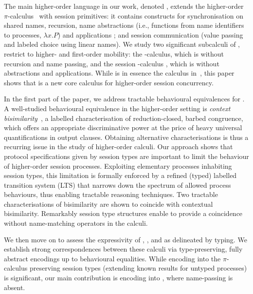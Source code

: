 The main higher-order language in our work, denoted \HOp,
extends the higher-order $\pi$-calculus~\cite{SangiorgiD:expmpa} with session primitives:
it contains constructs for 
synchronisation on shared names, 
recursion, 
name abstractions (i.e., functions from name identifiers  to processes, 
$\lambda x.P$) and applications 
;
and session communication (value passing and
labeled choice using linear names). 
We study two significant subcalculi of \HOp, 
restrict to higher- and first-order mobility:
the \HO-calculus, which is \HOp without recursion and name passing, and 
the session \sessp-calculus , which is \HOp without abstractions and applications.  
While \sessp is 
in essence the calculus in~\cite{honda.vasconcelos.kubo:language-primitives}, 
this paper shows that \HO  is a new core calculus 
for higher-order session concurrency.

In the first part of the paper, we address tractable behavioural equivalences
for \HOp.
A well-studied behavioural equivalence in the higher-order setting 
is \emph{context bisimilarity}~\cite{San96H},
a labelled characterisation of reduction-closed, barbed congruence, 
which offers an appropriate discriminative power at the price of heavy universal quantifications in output clauses.
Obtaining alternative characterisations 
is thus a recurring issue 
in the study of higher-order calculi. 
Our approach 
shows that protocol specifications given by session types are 
important to  limit 
the behaviour of higher-order session processes. 
Exploiting elementary processes inhabiting session types, 
this limitation is formally enforced by 
a refined (typed) labelled transition system (LTS)
that narrows down the spectrum of allowed process behaviours, 
thus enabling tractable reasoning techniques. 
Two tractable characterisations of bisimilarity 
are shown to coincide with contextual bisimilarity.
Remarkably session type structures enable to provide 
a coincidence without name-matching operators in the calculi.

We then move on to 
assess the expressivity 
 of \HOp, \HO, and \sessp as delineated by typing. 
We establish strong correspondences between 
these calculi  via type-preserving, fully abstract encodings up to 
behavioural equalities. While encoding \HOp 
into the $\pi$-calculus preserving session types 
(extending  known  results for untyped processes) is 
significant, 
our main contribution is 
encoding \HOp into \HO, where name-passing is absent.  

